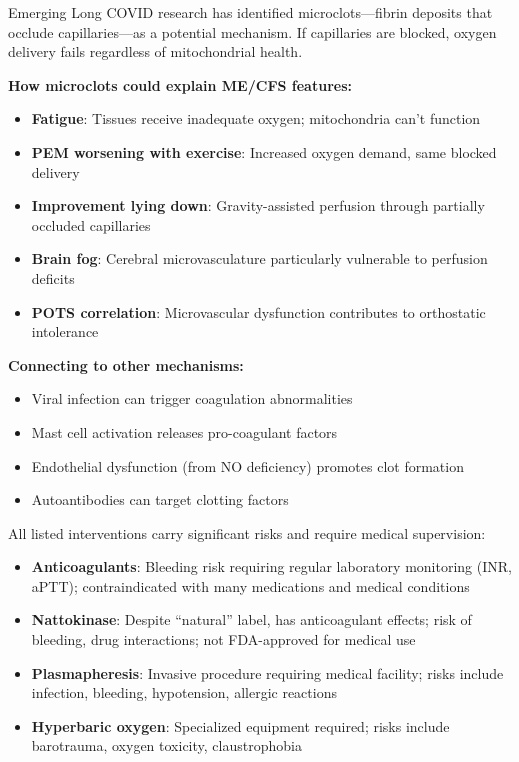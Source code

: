 \begin{hypothesis}
\label{hyp:microclot}
Emerging Long COVID research has identified microclots---fibrin deposits that occlude capillaries---as a potential mechanism. If capillaries are blocked, oxygen delivery fails regardless of mitochondrial health.

\textbf{How microclots could explain ME/CFS features:}
\begin{itemize}
    \item \textbf{Fatigue}: Tissues receive inadequate oxygen; mitochondria can't function
    \item \textbf{PEM worsening with exercise}: Increased oxygen demand, same blocked delivery
    \item \textbf{Improvement lying down}: Gravity-assisted perfusion through partially occluded capillaries
    \item \textbf{Brain fog}: Cerebral microvasculature particularly vulnerable to perfusion deficits
    \item \textbf{POTS correlation}: Microvascular dysfunction contributes to orthostatic intolerance
\end{itemize}

\textbf{Connecting to other mechanisms:}
\begin{itemize}
    \item Viral infection can trigger coagulation abnormalities
    \item Mast cell activation releases pro-coagulant factors
    \item Endothelial dysfunction (from NO deficiency) promotes clot formation
    \item Autoantibodies can target clotting factors
\end{itemize}

\begin{warning}
All listed interventions carry significant risks and require medical supervision:
\begin{itemize}
    \item \textbf{Anticoagulants}: Bleeding risk requiring regular laboratory monitoring (INR, aPTT); contraindicated with many medications and medical conditions
    \item \textbf{Nattokinase}: Despite ``natural'' label, has anticoagulant effects; risk of bleeding, drug interactions; not FDA-approved for medical use
    \item \textbf{Plasmapheresis}: Invasive procedure requiring medical facility; risks include infection, bleeding, hypotension, allergic reactions
    \item \textbf{Hyperbaric oxygen}: Specialized equipment required; risks include barotrauma, oxygen toxicity, claustrophobia
\end{itemize}


\end{warning}
\end{hypothesis}
